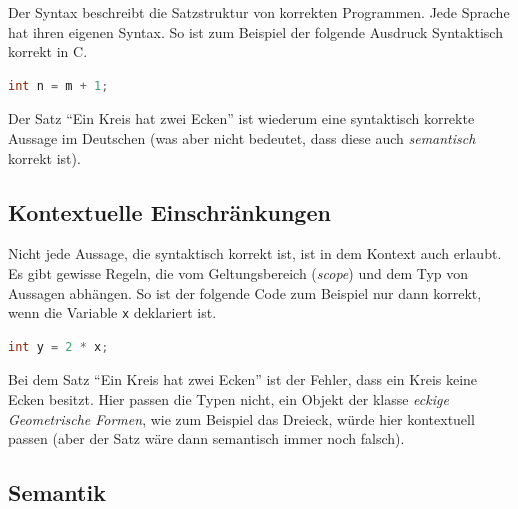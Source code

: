 \documentclass[ngerman,abstract=true]{scrartcl}
\begin{document}
Der Syntax beschreibt die Satzstruktur von korrekten Programmen. Jede Sprache hat ihren eigenen Syntax. So ist zum Beispiel der folgende Ausdruck Syntaktisch korrekt in C.
\begin{lstlisting}[language=C]
int n = m + 1;
\end{lstlisting}
Der Satz \enquote{Ein Kreis hat zwei Ecken} ist wiederum eine syntaktisch korrekte Aussage im Deutschen (was aber nicht bedeutet, dass diese auch \emph{semantisch} korrekt ist).

\subsection{Kontextuelle Einschränkungen}

Nicht jede Aussage, die syntaktisch korrekt ist, ist in dem Kontext auch erlaubt. Es gibt gewisse Regeln, die vom Geltungsbereich (\emph{scope}) und dem Typ von Aussagen abhängen. So ist der folgende Code zum Beispiel nur dann korrekt, wenn die Variable \verb|x| deklariert ist.
\begin{lstlisting}[language=C]
int y = 2 * x;
\end{lstlisting}
Bei dem Satz \enquote{Ein Kreis hat zwei Ecken} ist der Fehler, dass ein Kreis keine Ecken besitzt. Hier passen die Typen nicht, ein Objekt der klasse \emph{eckige Geometrische Formen}, wie zum Beispiel das Dreieck, würde hier kontextuell passen (aber der Satz wäre dann semantisch immer noch falsch).

\subsection{Semantik}
\end{document}
